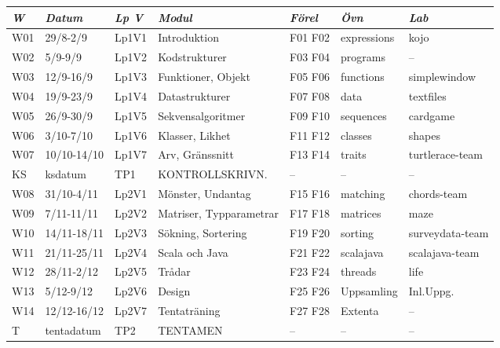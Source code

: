 \begin{tabular}{l|l|l|l|l|l|l}
\textit{W} & \textit{Datum} & \textit{Lp V} & \textit{Modul} & \textit{Förel} & \textit{Övn} & \textit{Lab} \\ \hline \hline
W01 & 29/8-2/9    & Lp1V1 & Introduktion            & F01 F02 & expressions & kojo            \\
W02 & 5/9-9/9     & Lp1V2 & Kodstrukturer           & F03 F04 & programs    & --              \\
W03 & 12/9-16/9   & Lp1V3 & Funktioner, Objekt      & F05 F06 & functions   & simplewindow    \\
W04 & 19/9-23/9   & Lp1V4 & Datastrukturer          & F07 F08 & data        & textfiles       \\
W05 & 26/9-30/9   & Lp1V5 & Sekvensalgoritmer       & F09 F10 & sequences   & cardgame        \\
W06 & 3/10-7/10   & Lp1V6 & Klasser, Likhet         & F11 F12 & classes     & shapes          \\
W07 & 10/10-14/10 & Lp1V7 & Arv, Gränssnitt         & F13 F14 & traits      & turtlerace-team \\
KS  & ksdatum     & TP1   & KONTROLLSKRIVN.         & --      & --          & --              \\
W08 & 31/10-4/11  & Lp2V1 & Mönster, Undantag       & F15 F16 & matching    & chords-team     \\
W09 & 7/11-11/11  & Lp2V2 & Matriser, Typparametrar & F17 F18 & matrices    & maze            \\
W10 & 14/11-18/11 & Lp2V3 & Sökning, Sortering      & F19 F20 & sorting     & surveydata-team \\
W11 & 21/11-25/11 & Lp2V4 & Scala och Java          & F21 F22 & scalajava   & scalajava-team  \\
W12 & 28/11-2/12  & Lp2V5 & Trådar                  & F23 F24 & threads     & life            \\
W13 & 5/12-9/12   & Lp2V6 & Design                  & F25 F26 & Uppsamling  & Inl.Uppg.       \\
W14 & 12/12-16/12 & Lp2V7 & Tentaträning            & F27 F28 & Extenta     & --              \\
T   & tentadatum  & TP2   & TENTAMEN                & --      & --          & --              \\
\end{tabular}
